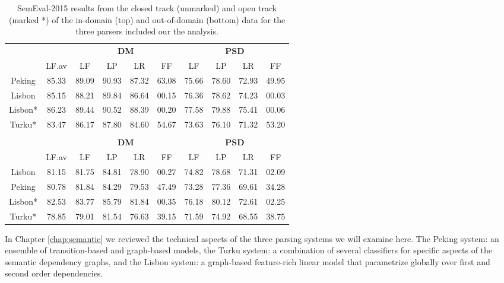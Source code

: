 \begin{table}
    \centering
    \begin{tabular}{@{}cccccccccc@{}}
        \toprule
        \multicolumn{1}{c}{ }
        & \multicolumn{1}{c}{ }
        & \multicolumn{4}{c}{\textbf{DM}}
        & \multicolumn{4}{c}{\textbf{PSD}} \\
        \cmidrule(lr){3-6}
        \cmidrule(lr){7-10}
        &
        LF.av &
        LF & LP & LR & FF &
        LF & LP & LR & FF \\
        \midrule
        Peking & 85.33 & 89.09 & 90.93 & 87.32 & 63.08 & 75.66 & 78.60 & 72.93 & 49.95 \\
        Lisbon & 85.15 & 88.21 & 89.84 & 86.64 & 00.15 & 76.36 & 78.62 & 74.23 & 00.03 \\
        \midrule
        Lisbon* & 86.23 & 89.44 & 90.52 & 88.39 & 00.20 & 77.58 & 79.88 & 75.41 & 00.06 \\
        Turku* & 83.47 & 86.17 & 87.80 & 84.60 & 54.67 & 73.63 & 76.10 & 71.32 & 53.20 \\
        \bottomrule
        
        \\
        \toprule
        \multicolumn{1}{c}{ }
        & \multicolumn{1}{c}{ }
        & \multicolumn{4}{c}{\textbf{DM}}
        & \multicolumn{4}{c}{\textbf{PSD}} \\
        \cmidrule(lr){3-6}
        \cmidrule(lr){7-10}
        &
        LF.av &
        LF & LP & LR & FF &
        LF & LP & LR & FF \\
        \midrule
        Lisbon & 81.15 & 81.75 & 84.81 & 78.90 & 00.27 & 74.82 & 78.68 & 71.31 & 02.09 \\
        Peking & 80.78 & 81.84 & 84.29 & 79.53 & 47.49 & 73.28 & 77.36 & 69.61 & 34.28 \\
        \midrule
        Lisbon* & 82.53 & 83.77 & 85.79 & 81.84 & 00.35 & 76.18 & 80.12 & 72.61 & 02.25 \\
        Turku* & 78.85 & 79.01 & 81.54 & 76.63 & 39.15 & 71.59 & 74.92 & 68.55 & 38.75 \\
        \bottomrule
    \end{tabular}
    \caption{SemEval-2015 results from the closed track (unmarked) and open track (marked *) of the in-domain (top) and out-of-domain (bottom) data for the three parsers included our the analysis.}
    \label{fig:data:recap}
\end{table}

In Chapter \ref{chap:semantic} we reviewed the technical aspects of the three parsing systems we will examine here. The Peking system: an ensemble of transition-based and graph-based models, the Turku system: a combination of several classifiers for specific aspects of the semantic dependency graphs, and the Lisbon system: a graph-based feature-rich linear model that parametrize globally over first and second order dependencies.

